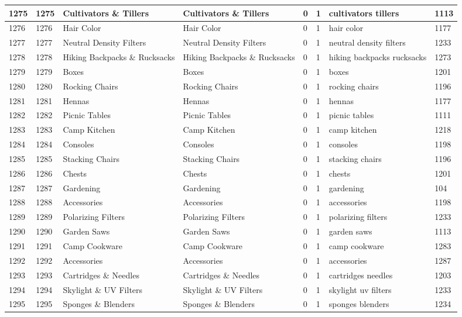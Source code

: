 \begin{longtable}{|l|l|l|l|l|l|l|l|}
1275 & 1275 & Cultivators \& Tillers & Cultivators \& Tillers & 0 & 1 & cultivators tillers & 1113 \\ \hline 
1276 & 1276 & Hair Color & Hair Color & 0 & 1 & hair color & 1177 \\ \hline 
1277 & 1277 & Neutral Density Filters & Neutral Density Filters & 0 & 1 & neutral density filters & 1233 \\ \hline 
1278 & 1278 & Hiking Backpacks \& Rucksacks & Hiking Backpacks \& Rucksacks & 0 & 1 & hiking backpacks rucksacks & 1273 \\ \hline 
1279 & 1279 & Boxes & Boxes & 0 & 1 & boxes & 1201 \\ \hline 
1280 & 1280 & Rocking Chairs & Rocking Chairs & 0 & 1 & rocking chairs & 1196 \\ \hline 
1281 & 1281 & Hennas & Hennas & 0 & 1 & hennas & 1177 \\ \hline 
1282 & 1282 & Picnic Tables & Picnic Tables & 0 & 1 & picnic tables & 1111 \\ \hline 
1283 & 1283 & Camp Kitchen & Camp Kitchen & 0 & 1 & camp kitchen & 1218 \\ \hline 
1284 & 1284 & Consoles & Consoles & 0 & 1 & consoles & 1198 \\ \hline 
1285 & 1285 & Stacking Chairs & Stacking Chairs & 0 & 1 & stacking chairs & 1196 \\ \hline 
1286 & 1286 & Chests & Chests & 0 & 1 & chests & 1201 \\ \hline 
1287 & 1287 & Gardening & Gardening & 0 & 1 & gardening & 104 \\ \hline 
1288 & 1288 & Accessories & Accessories & 0 & 1 & accessories & 1198 \\ \hline 
1289 & 1289 & Polarizing Filters & Polarizing Filters & 0 & 1 & polarizing filters & 1233 \\ \hline 
1290 & 1290 & Garden Saws & Garden Saws & 0 & 1 & garden saws & 1113 \\ \hline 
1291 & 1291 & Camp Cookware & Camp Cookware & 0 & 1 & camp cookware & 1283 \\ \hline 
1292 & 1292 & Accessories & Accessories & 0 & 1 & accessories & 1287 \\ \hline 
1293 & 1293 & Cartridges \& Needles & Cartridges \& Needles & 0 & 1 & cartridges needles & 1203 \\ \hline 
1294 & 1294 & Skylight \& UV Filters & Skylight \& UV Filters & 0 & 1 & skylight uv filters & 1233 \\ \hline 
1295 & 1295 & Sponges \& Blenders & Sponges \& Blenders & 0 & 1 & sponges blenders & 1234 \\ \hline 

\end{longtable}
